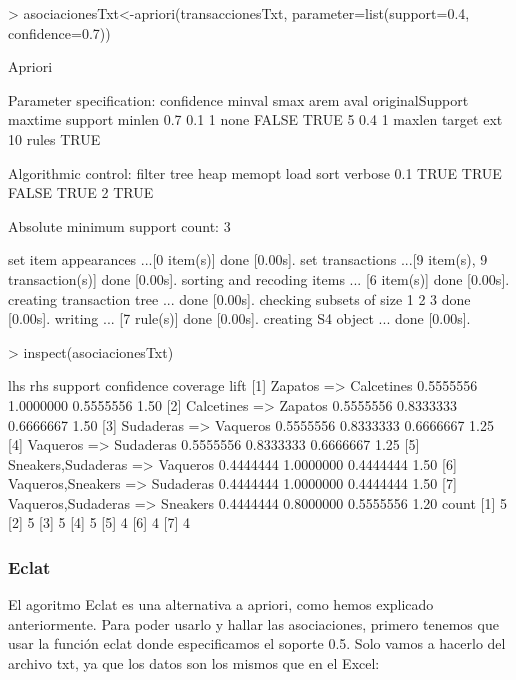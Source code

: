 \documentclass [a4paper] {article}
\begin{document}
\begin{Schunk}
\begin{Sinput}
> asociacionesTxt<-apriori(transaccionesTxt, parameter=list(support=0.4, confidence=0.7))
\end{Sinput}
\begin{Soutput}
Apriori

Parameter specification:
 confidence minval smax arem  aval originalSupport maxtime support minlen
        0.7    0.1    1 none FALSE            TRUE       5     0.4      1
 maxlen target  ext
     10  rules TRUE

Algorithmic control:
 filter tree heap memopt load sort verbose
    0.1 TRUE TRUE  FALSE TRUE    2    TRUE

Absolute minimum support count: 3 

set item appearances ...[0 item(s)] done [0.00s].
set transactions ...[9 item(s), 9 transaction(s)] done [0.00s].
sorting and recoding items ... [6 item(s)] done [0.00s].
creating transaction tree ... done [0.00s].
checking subsets of size 1 2 3 done [0.00s].
writing ... [7 rule(s)] done [0.00s].
creating S4 object  ... done [0.00s].
\end{Soutput}
\begin{Sinput}
> inspect(asociacionesTxt)
\end{Sinput}
\begin{Soutput}
    lhs                     rhs          support   confidence coverage  lift
[1] {Zapatos}            => {Calcetines} 0.5555556 1.0000000  0.5555556 1.50
[2] {Calcetines}         => {Zapatos}    0.5555556 0.8333333  0.6666667 1.50
[3] {Sudaderas}          => {Vaqueros}   0.5555556 0.8333333  0.6666667 1.25
[4] {Vaqueros}           => {Sudaderas}  0.5555556 0.8333333  0.6666667 1.25
[5] {Sneakers,Sudaderas} => {Vaqueros}   0.4444444 1.0000000  0.4444444 1.50
[6] {Vaqueros,Sneakers}  => {Sudaderas}  0.4444444 1.0000000  0.4444444 1.50
[7] {Vaqueros,Sudaderas} => {Sneakers}   0.4444444 0.8000000  0.5555556 1.20
    count
[1] 5    
[2] 5    
[3] 5    
[4] 5    
[5] 4    
[6] 4    
[7] 4    
\end{Soutput}
\end{Schunk}


\subsubsection{Eclat}
El agoritmo Eclat es una alternativa a apriori, como hemos explicado anteriormente.
Para poder usarlo y hallar las asociaciones, primero tenemos que usar la función eclat
donde especificamos el soporte 0.5. Solo vamos a hacerlo del archivo txt, ya que los datos
son los mismos que en el Excel:
\end{document}
